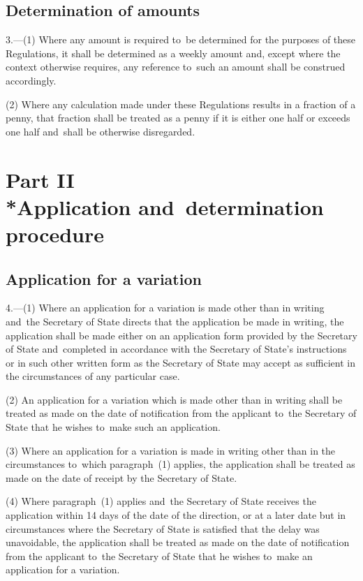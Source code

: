 \documentclass[12pt,a4paper]{article}
\begin{document}
\subsection[3. Determination of amounts]{Determination of amounts}

3.---(1)  Where any amount is required to~be determined for the purposes of these Regulations, it shall be determined as a weekly amount and, except where the context otherwise requires, any reference to~such an amount shall be construed accordingly.

(2) Where any calculation made under these Regulations results in a fraction of a penny, that fraction shall be treated as a penny if it is either one half or exceeds one half and~shall be otherwise disregarded.

\section[Part II --- Application and~determination procedure]{Part II\\*Application and~determination procedure}

\renewcommand\parthead{--- Part II}

\subsection[4. Application for a variation]{Application for a variation}

4.---(1)  Where an application for a variation is made other than in writing and~the Secretary of State directs that the application be made in writing, the application shall be made either on an application form provided by the Secretary of State and~completed in accordance with the Secretary of State’s instructions or in such other written form as the Secretary of State may accept as sufficient in the circumstances of any particular case.

(2) An application for a variation which is made other than in writing shall be treated as made on the date of notification from the applicant to~the Secretary of State that he wishes to~make such an application.

(3) Where an application for a variation is made in writing other than in the circumstances to~which paragraph~(1) applies, the application shall be treated as made on the date of receipt by the Secretary of State.

(4) Where paragraph~(1) applies and~the Secretary of State receives the application within 14 days of the date of the direction, or at a later date but in circumstances where the Secretary of State is satisfied that the delay was unavoidable, the application shall be treated as made on the date of notification from the applicant to~the Secretary of State that he wishes to~make an application for a variation.
\end{document}
